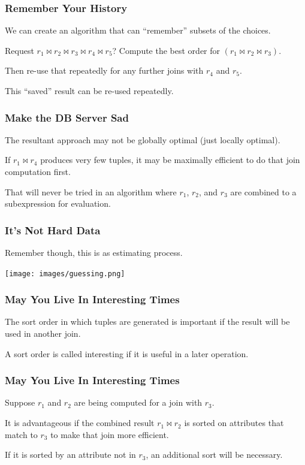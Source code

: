 \begin{frame}
\frametitle{Remember Your History}

We can create an algorithm that can ``remember'' subsets of the choices. 

Request  $r_{1} \bowtie r_{2} \bowtie r_{3} \bowtie r_{4} \bowtie r_{5}$? Compute the best order for $(r_{1} \bowtie r_{2} \bowtie r_{3})$. 

Then re-use that repeatedly for any further joins with $r_{4}$ and $r_{5}$. 

This ``saved'' result can be re-used repeatedly.

\end{frame}

\begin{frame}
\frametitle{Make the DB Server Sad}

The resultant approach may not be globally optimal (just locally optimal). 

If $r_{1} \bowtie r_{4}$ produces very few tuples, it may be maximally efficient to do that join computation first.

That will never be tried in an algorithm where $r_{1}$, $r_{2}$, and $r_{3}$ are combined to a subexpression for evaluation. 

\end{frame}

\begin{frame}
\frametitle{It's Not Hard Data}

Remember though, this is as estimating process. 

\begin{center}
	\texttt{[image: images/guessing.png]}
\end{center}

\end{frame}

\begin{frame}
\frametitle{May You Live In Interesting Times}

The sort order in which tuples are generated is important if the result will be used in another join. 

A sort order is called \alert{interesting} if it is useful in a later operation. 

\end{frame}

\begin{frame}
\frametitle{May You Live In Interesting Times}

Suppose $r_{1}$ and $r_{2}$ are being computed for a join with $r_{3}$.

It is advantageous if the combined result $r_{1} \bowtie r_{2}$ is sorted on attributes that match to $r_{3}$ to make that join more efficient.

If it is sorted by an attribute not in $r_{3}$, an additional sort will be necessary.

\end{frame}

